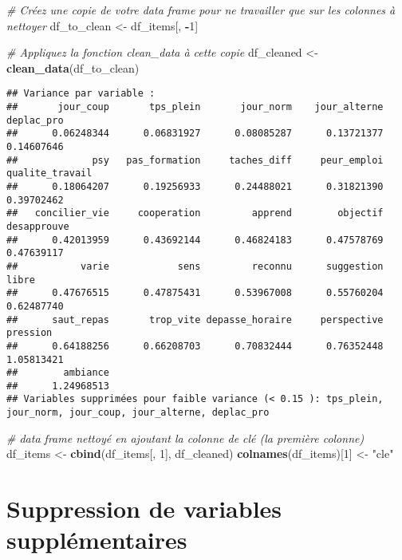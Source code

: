 \documentclass[
]{article}
\newenvironment{Shaded}{\begin{snugshade}}{\end{snugshade}}
\newcommand{\CommentTok}[1]{\textcolor[rgb]{0.56,0.35,0.01}{\textit{#1}}}
\newcommand{\DecValTok}[1]{\textcolor[rgb]{0.00,0.00,0.81}{#1}}
\newcommand{\FunctionTok}[1]{\textcolor[rgb]{0.13,0.29,0.53}{\textbf{#1}}}
\newcommand{\NormalTok}[1]{#1}
\newcommand{\OtherTok}[1]{\textcolor[rgb]{0.56,0.35,0.01}{#1}}
\newcommand{\SpecialCharTok}[1]{\textcolor[rgb]{0.81,0.36,0.00}{\textbf{#1}}}
\newcommand{\StringTok}[1]{\textcolor[rgb]{0.31,0.60,0.02}{#1}}
\begin{document}
\begin{Shaded}
\begin{Highlighting}[]
\CommentTok{\# Créez une copie de votre data frame pour ne travailler que sur les colonnes à nettoyer}
\NormalTok{df\_to\_clean }\OtherTok{\textless{}{-}}\NormalTok{ df\_items[, }\SpecialCharTok{{-}}\DecValTok{1}\NormalTok{]}

\CommentTok{\# Appliquez la fonction \textquotesingle{}clean\_data\textquotesingle{} à cette copie}
\NormalTok{df\_cleaned }\OtherTok{\textless{}{-}} \FunctionTok{clean\_data}\NormalTok{(df\_to\_clean)}
\end{Highlighting}
\end{Shaded}

\begin{verbatim}
## Variance par variable :
##       jour_coup       tps_plein       jour_norm    jour_alterne      deplac_pro 
##      0.06248344      0.06831927      0.08085287      0.13721377      0.14607646 
##             psy   pas_formation     taches_diff     peur_emploi qualite_travail 
##      0.18064207      0.19256933      0.24488021      0.31821390      0.39702462 
##   concilier_vie     cooperation         apprend        objectif     desapprouve 
##      0.42013959      0.43692144      0.46824183      0.47578769      0.47639117 
##           varie            sens         reconnu      suggestion           libre 
##      0.47676515      0.47875431      0.53967008      0.55760204      0.62487740 
##      saut_repas       trop_vite depasse_horaire     perspective        pression 
##      0.64188256      0.66208703      0.70832444      0.76352448      1.05813421 
##        ambiance 
##      1.24968513 
## Variables supprimées pour faible variance (< 0.15 ): tps_plein, jour_norm, jour_coup, jour_alterne, deplac_pro
\end{verbatim}

\begin{Shaded}
\begin{Highlighting}[]
\CommentTok{\# data frame nettoyé en ajoutant la colonne de clé (la première colonne)}
\NormalTok{df\_items }\OtherTok{\textless{}{-}} \FunctionTok{cbind}\NormalTok{(df\_items[, }\DecValTok{1}\NormalTok{], df\_cleaned)}
\FunctionTok{colnames}\NormalTok{(df\_items)[}\DecValTok{1}\NormalTok{] }\OtherTok{\textless{}{-}} \StringTok{"cle"}
\end{Highlighting}
\end{Shaded}

\section{Suppression de variables
supplémentaires}\label{suppression-de-variables-suppluxe9mentaires}
\end{document}
